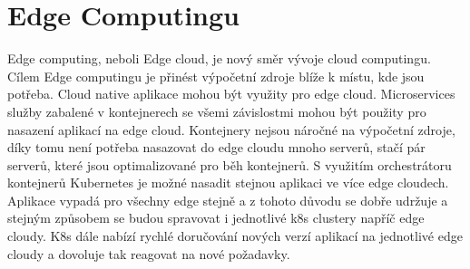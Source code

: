 \chapter{Edge Computingu}
 Edge computing, neboli Edge cloud, je nový směr vývoje cloud computingu. Cílem Edge computingu je přinést výpočetní zdroje blíže k místu, kde jsou potřeba. Cloud native aplikace mohou být využity pro edge cloud. Microservices služby zabalené v kontejnerech se všemi závislostmi mohou být použity pro nasazení aplikací na edge cloud. Kontejnery nejsou náročné na výpočetní zdroje, díky tomu není potřeba nasazovat do edge cloudu mnoho serverů, stačí pár serverů, které jsou optimalizované pro běh kontejnerů. S využitím orchestrátoru kontejnerů Kubernetes je možné nasadit stejnou aplikaci ve více edge cloudech. Aplikace vypadá pro všechny edge stejně a z tohoto důvodu se dobře udržuje a stejným způsobem se budou spravovat i jednotlivé k8s clustery napříč edge cloudy. K8s dále nabízí rychlé doručování nových verzí aplikací na jednotlivé edge cloudy a dovoluje tak reagovat na nové požadavky.\par
